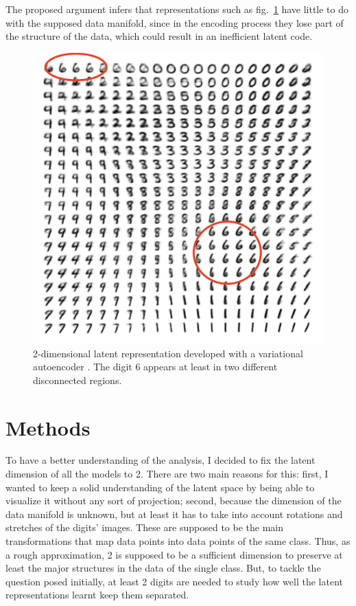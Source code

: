 \documentclass[twocolumn,gsifonts,twoside]{gsipaper}
\begin{document}
The proposed argument infers that representations such as fig.~\ref{fig:vae} have little to do with the supposed data manifold, since in the encoding process they lose part of the structure of the data, which could result in an inefficient latent code.

\begin{figure}
  \centering
  \includegraphics[width=.6\linewidth]{image_from_vae.png}
  \caption{2-dimensional latent representation developed with a variational autoencoder \cite{Kingma2022}. The digit 6 appears at least in two different disconnected regions.}
  \label{fig:vae}
\end{figure}


\section{Methods}
To have a better understanding of the analysis, I decided to fix the latent dimension of all the models to 2. There are two main reasons for this: first, I wanted to keep a solid understanding of the latent space by being able to visualize it without any sort of projection; second, because the dimension of the data manifold is unknown, but at least it has to take into account rotations and stretches of the digits' images. These are supposed to be the main transformations that map data points into data points of the same class. Thus, as a rough approximation, 2 is supposed to be a sufficient dimension to preserve at least the major structures in the data of the single class. But, to tackle the question posed initially, at least 2 digits are needed to study how well the latent representations learnt keep them separated.
\end{document}
